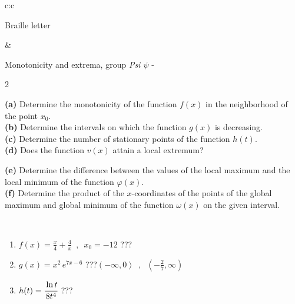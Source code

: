 \documentclass[10pt]{report}
\begin{document}
\begin{tabular}{c:c}
\begin{minipage}[c][104.5mm][t]{0.5\linewidth}
\begin{center}
\begin{minipage}{0.20\linewidth}
\begin{center}
{\small Braille letter}
\end{center}
\end{minipage}
\end{center}
\end{minipage}
&
\begin{minipage}[c][104.5mm][t]{0.5\linewidth}
\begin{center}
\vspace{5mm}
{\huge Monotonicity and extrema, group \textit{Psi $\psi$} -}\\[5mm]
\begin{minipage}{0.95\linewidth}
\begin{center}
{\small \begin{multicols}{2} \raggedright
\textbf{(a)} Determine the monotonicity of the function \(f(x)\) in the neighborhood of the point \(x_0\). \\[1mm]
\textbf{(b)} Determine the intervals on which the function \(g(x)\) is decreasing. \\[1mm]
\textbf{(c)} Determine the number of stationary points of the function \(h(t)\). \\[1mm]
\textbf{(d)} Does the function \(v(x)\) attain a local extremum? \par \columnbreak
\textbf{(e)} Determine the difference between the values of the local maximum and the local minimum of the function \(\varphi(x)\). \\[1mm]
\textbf{(f)} Determine the product of the \(x\)-coordinates of the points of the global maximum and global minimum of the function \(\omega(x)\) on the given interval. \\[1mm]
\end{multicols}
}
\end{center}
\end{minipage}
\\[1mm]
\begin{minipage}{0.79\linewidth}
\begin{center}
\begin{varwidth}{\linewidth}
\setlength{\itemsep}{0pt}
\begin{enumerate}
\normalsize
\item $f(x)=\frac{x}{4}+\frac{4}{x} \enspace , \enspace x_0=-12$\quad \dotfill\; ???\;\dotfill \quad {}
\item $g(x)=x^2\, e^{7x-6}$\quad \dotfill\; ???\;\dotfill \quad $\left(-\infty , 0\right\rangle\enspace , \enspace \left\langle-\frac{2}{7} , \infty\right)$
\item $h(t)=\cfrac{\ln t}{8t^4}$\quad \dotfill\; ???\;\dotfill {}

\end{enumerate}
\end{varwidth}
\end{center}
\end{minipage}
\end{center}
\end{minipage}
\end{tabular}
\end{document}
